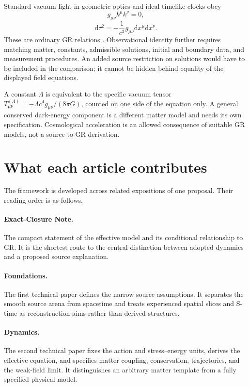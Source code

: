 \documentclass[11pt,oneside]{report}
\newcommand{\dd}{\mathrm d}
\theoremstyle{remark}
\numberwithin{definition}{chapter}
\numberwithin{proposition}{chapter}
\numberwithin{remark}{chapter}
\begin{document}
Standard vacuum light in geometric optics and ideal timelike clocks obey
\begin{equation}
g_{\mu\nu}k^\mu k^\nu=0,
\label{exact_closure_sequence_overview:eq:null}
\end{equation}
\begin{equation}
\dd\tau^2=-\frac{1}{c^2}g_{\mu\nu}\dd x^\mu\dd x^\nu.
\label{exact_closure_sequence_overview:eq:propertime}
\end{equation}
These are ordinary GR relations \parencite{Carroll1997}. Observational identity further requires matching matter, constants, admissible solutions, initial and boundary data, and measurement procedures. An added source restriction on solutions would have to be included in the comparison; it cannot be hidden behind equality of the displayed field equations.

A constant $\Lambda$ is equivalent to the specific vacuum tensor
$T^{(\Lambda)}_{\mu\nu}=-\Lambda c^4g_{\mu\nu}/(8\pi G)$, counted on one side of the equation only. A general conserved dark-energy component is a different matter model and needs its own specification. Cosmological acceleration is an allowed consequence of suitable GR models, not a source-to-GR derivation.

\section{What each article contributes}
The framework is developed across related expositions of one proposal. Their reading order is as follows.

\paragraph{Exact-Closure Note.} The compact statement of the effective model and its conditional relationship to GR. It is the shortest route to the central distinction between adopted dynamics and a proposed source explanation.

\paragraph{Foundations.} The first technical paper defines the narrow source assumptions. It separates the smooth source arena from spacetime and treats experienced spatial slices and S-time as reconstruction aims rather than derived structures.

\paragraph{Dynamics.} The second technical paper fixes the action and stress--energy units, derives the effective equation, and specifies matter coupling, conservation, trajectories, and the weak-field limit. It distinguishes an arbitrary matter template from a fully specified physical model.
\end{document}
